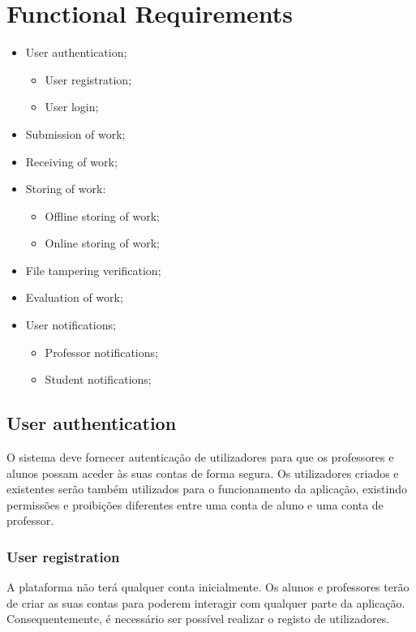 \documentclass[10pt]{article}
\begin{document}
\newpage

\section{Functional Requirements}
\begin{itemize}
    \item User authentication;
        \begin{itemize}
            \item User registration;
            \item User login;
        \end{itemize}
    \item Submission of work;
    \item Receiving of work;
    \item Storing of work:
        \begin{itemize}
            \item Offline storing of work;
            \item Online storing of work;
        \end{itemize}
    \item File tampering verification;
    \item Evaluation of work;
    \item User notifications;
        \begin{itemize}
            \item Professor notifications;
            \item Student notifications;
        \end{itemize}
\end{itemize}

\newpage

\subsection{User authentication}
O sistema deve fornecer autenticação de utilizadores para que os 
professores e alunos possam aceder às suas contas de forma segura. 
Os utilizadores criados e existentes serão também utilizados para 
o funcionamento da aplicação, existindo permissões e proibições diferentes
entre uma conta de aluno e uma conta de professor.

\subsubsection{User registration}
A plataforma não terá qualquer conta inicialmente. Os alunos e professores terão
de criar as suas contas para poderem interagir com qualquer parte da aplicação.
Consequentemente, é necessário ser possível realizar o registo de utilizadores.
\end{document}
